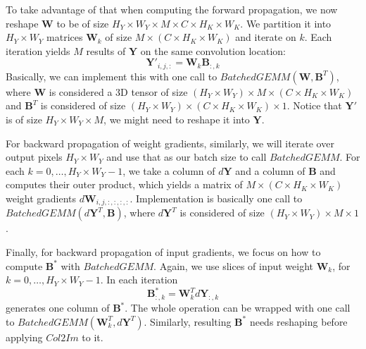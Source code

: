 \documentclass[authordraft=true,dvipsnames]{acmart}
\newcommand{\bw}[0]{\mathbf{W}}
\newcommand{\by}[0]{\mathbf{Y}}
\newcommand{\bb}[0]{\mathbf{B}}
\begin{document}
To take advantage of that when computing the forward propagation, we now reshape $\bw$ to be of size $H_Y \times W_Y \times M \times C \times H_K \times W_K$. We partition it into $H_Y \times W_Y$ matrices $\bw_k$ of size $M \times (C \times H_K \times W_K)$ and iterate on $k$. Each iteration yields $M$ results of $\by$ on the same convolution location:
\begin{equation*}
\by'_{i,j,:} = \bw_k \bb_{:,k}
\end{equation*}
Basically, we can implement this with one call to $BatchedGEMM(\bw, \bb^T)$, where $\bw$ is considered a 3D tensor of size $(H_Y \times W_Y) \times M \times (C \times H_K \times W_K)$ and $\bb^T$ is considered of size $(H_Y \times W_Y) \times (C \times H_K \times W_K) \times 1$. Notice that $\by'$ is of size $H_Y \times W_Y \times M$, we might need to reshape it into $\by$.

For backward propagation of weight gradients, similarly, we will iterate over output pixels $H_Y \times W_Y$ and use that as our batch size to call $BatchedGEMM$. For each $k=0,\ldots,H_Y \times W_Y-1$, we take a column of $d\by$ and a column of $\bb$ and computes their outer product, which yields a matrix of $M \times (C \times H_K \times W_K)$ weight gradients $d\bw_{i,j,:,:,:,:}$. Implementation is basically one call to $BatchedGEMM(d\by^T, \bb)$, where $d\by^T$ is considered of size $(H_Y \times W_Y) \times M \times 1$.

Finally, for backward propagation of input gradients, we focus on how to compute $\bb^*$ with $BatchedGEMM$. Again, we use slices of input weight $\bw_k$, for $k=0,\ldots,H_Y \times W_Y -1$. In each iteration 
\begin{equation*}
\bb^*_{:,k} = \bw_k^T d\by_{:,k}
\end{equation*}
generates one column of $\bb^*$. The whole operation can be wrapped with one call to $BatchedGEMM(\bw_k^T, d\by^T)$. Similarly, resulting $\bb^*$ needs reshaping before applying $Col2Im$ to it. 



 
\end{document}
